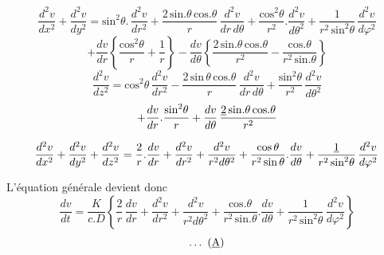 \documentclass[11pt,a4paper]{article}
\begin{document}
\[ \frac{d^{2}v}{dx^{2}} + \frac{d^{2}v}{dy^{2}} = \text{sin}^{2}\theta.\,\frac{d^{2}v}{dr^{2}} + \frac{2\,\text{sin.}\theta\,\text{cos.}\theta}{r}\,\frac{d^{2}v}{dr\,d\theta} + \frac{\text{cos}^{2}\theta}{r^{2}}.\frac{d^{2}v}{d\theta^{2}} + \frac{1}{r^{2}\,\text{sin}^{2}\theta}\,\frac{d^{2}v}{d\varphi^{2}} \]
\[ + \frac{dv}{dr}\left\{\frac{\text{cos}^{2}\theta}{r} + \frac{1}{r}\right\} - \frac{dv}{d\theta}\left\{\frac{2\,\text{sin.}\theta\,\text{cos.}\theta}{r^{2}} - \frac{\text{cos.}\theta}{r^{2}\,\text{sin.}\theta}\right\} \]
\[ \frac{d^{2}v}{dz^{2}} = \text{cos}^{2}\theta\,\frac{d^{2}v}{dr^{2}} - \frac{2\,\text{sin}\,\theta\,\text{cos.}\theta}{r}\,\frac{d^{2}v}{dr\,d\theta} + \frac{\text{sin}^{2}\theta}{r^{2}}\,\frac{d^{2}v}{d\theta^{2}} \]
\[ + \frac{dv}{dr}.\frac{\text{sin}^{2}\theta}{r} + \frac{dv}{d\theta}\,\frac{\uncertain{2}\,\text{sin.}\theta\,\text{cos.}\theta}{r^{2}} \]

\[ \frac{d^{2}v}{dx^{2}} + \frac{d^{2}v}{dy^{2}} + \frac{d^{2}v}{dz^{2}} = \frac{2}{r}.\frac{dv}{dr} + \frac{d^{2}v}{dr^{2}} + \frac{d^{2}v}{r^{2}d\theta^{2}} + \frac{\text{cos}\,\theta}{r^{2}\,\text{sin}\,\theta}.\frac{dv}{d\theta} + \frac{\uncertain{1}}{r^{2}\,\text{sin}^{2}\theta}\,\frac{d^{2}v}{d\varphi^{2}} \]

L'équation générale devient donc
\[ \frac{dv}{dt} = \frac{K}{c.D}\left\{\frac{2}{r}\,\frac{dv}{dr} + \frac{d^{2}v}{dr^{2}} + \frac{d^{2}v}{r^{2}d\theta^{2}} + \frac{\text{cos.}\theta}{r^{2}\,\text{sin.}\theta}.\frac{dv}{d\theta} + \frac{1}{r^{2}\,\text{sin}^{2}\theta}\,\frac{d^{2}v}{d\varphi^{2}}\right\} \]
\[ \ldots\ (\uncertain{\text{A}}) \]
\end{document}
